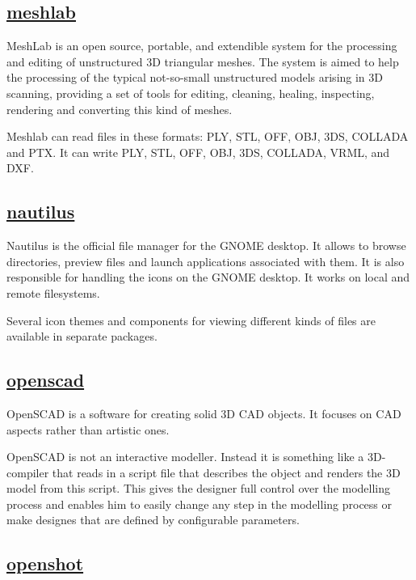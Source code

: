 \subsection{\href{http://meshlab.sourceforge.net/}{meshlab}}

 MeshLab is an open source, portable, and extendible system for the
 processing and editing of unstructured 3D triangular meshes.
 The system is aimed to help the processing of the typical not-so-small
 unstructured models arising in 3D scanning, providing a set of tools for
 editing, cleaning, healing, inspecting, rendering and converting this kind
 of meshes.
 
 Meshlab can read files in these formats: PLY, STL, OFF, OBJ, 3DS, COLLADA
 and PTX. It can write PLY, STL, OFF, OBJ, 3DS, COLLADA, VRML, and DXF.

\subsection{\href{http://www.gnome.org/projects/nautilus/}{nautilus}}

 Nautilus is the official file manager for the GNOME desktop. It allows
 to browse directories, preview files and launch applications associated
 with them. It is also responsible for handling the icons on the GNOME
 desktop. It works on local and remote filesystems.
 
 Several icon themes and components for viewing different kinds of files
 are available in separate packages.

\subsection{\href{http://openscad.org/}{openscad}}

 OpenSCAD is a software for creating solid 3D CAD objects. It focuses on CAD
 aspects rather than artistic ones.
 
 OpenSCAD is not an interactive modeller. Instead it is something like a
 3D-compiler that reads in a script file that describes the object and renders
 the 3D model from this script. This gives the designer full control over the
 modelling process and enables him to easily change any step in the modelling
 process or make designes that are defined by configurable parameters.

\subsection{\href{http://www.openshotvideo.com/}{openshot}}

